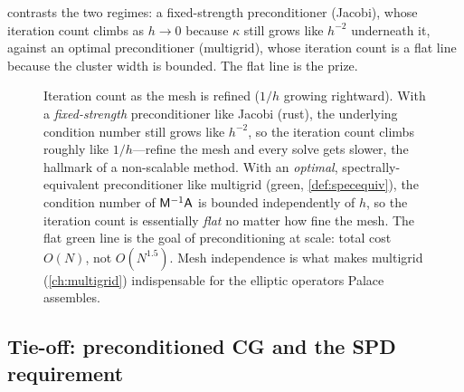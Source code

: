  contrasts the two regimes: a fixed-strength preconditioner (Jacobi),
whose iteration count climbs as $h\to0$ because $\kappa$ still grows like $h^{-2}$ underneath
it, against an optimal preconditioner (multigrid), whose iteration count is a flat line
because the cluster width is bounded. The flat line is the prize.

\begin{figure}[t]
\centering
{}
\caption[Mesh-dependent versus mesh-independent convergence]{Iteration count as the mesh is
refined ($1/h$ growing rightward). With a \emph{fixed-strength} preconditioner like Jacobi
(rust), the underlying condition number still grows like $h^{-2}$, so the iteration count
climbs roughly like $1/h$---refine the mesh and every solve gets slower, the hallmark of a
non-scalable method. With an \emph{optimal}, spectrally-equivalent preconditioner like
multigrid (green, \cref{def:specequiv}), the condition number of $\mathsf{M}^{-1}\mathsf{A}$ is
bounded independently of $h$, so the iteration count is essentially \emph{flat} no matter how
fine the mesh. The flat green line is the goal of preconditioning at scale: total cost
$O(N)$, not $O(N^{1.5})$. Mesh independence is what makes multigrid (\cref{ch:multigrid})
indispensable for the elliptic operators Palace assembles.}
\label{fig:meshindep}
\end{figure}

\subsection{Tie-off: preconditioned CG and the SPD requirement}
\label{sec:pcg-tie}

